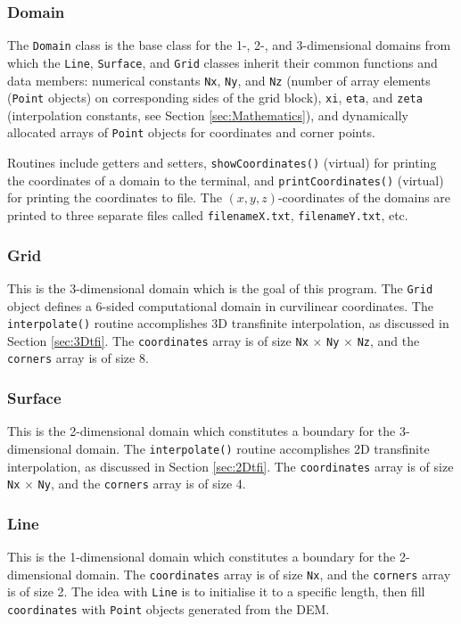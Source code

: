 \documentclass{article}
\renewcommand{\t}[1]{\texttt{#1}}
\begin{document}
\subsubsection{Domain}
The \t{Domain} class is the base class for the 1-, 2-, and 3-dimensional domains from which the \t{Line}, \t{Surface}, and \t{Grid} classes inherit their common functions and data members: numerical constants \t{Nx}, \t{Ny}, and \t{Nz} (number of array elements (\t{Point} objects) on corresponding sides of the grid block), \t{xi}, \t{eta}, and \t{zeta} (interpolation constants, see Section \ref{sec:Mathematics}), and dynamically allocated arrays of \t{Point} objects for coordinates and corner points. 

Routines include getters and setters, \t{showCoordinates()} (virtual) for printing the coordinates of a domain to the terminal, and \t{printCoordinates()} (virtual) for printing the coordinates to file. The $(x,y,z)$-coordinates of the domains are printed to three separate files called \t{filenameX.txt}, \t{filenameY.txt}, etc.

\subsubsection{Grid}
This is the 3-dimensional domain which is the goal of this program.  The \t{Grid} object defines a 6-sided computational domain in curvilinear coordinates. The \t{interpolate()} routine accomplishes 3D transfinite interpolation, as discussed in Section \ref{sec:3Dtfi}. The \t{coordinates} array is of size \t{Nx} $\times$ \t{Ny} $\times$ \t{Nz}, and the \t{corners} array is of size 8.

\subsubsection{Surface}
This is the 2-dimensional domain which constitutes a boundary for the 3-dimensional domain. The \t{interpolate()} routine accomplishes 2D transfinite interpolation, as discussed in Section \ref{sec:2Dtfi}. The \t{coordinates} array is of size \t{Nx} $\times$ \t{Ny}, and the \t{corners} array is of size 4.

\subsubsection{Line}
This is the 1-dimensional domain which constitutes a boundary for the 2-dimensional domain. The \t{coordinates} array is of size \t{Nx}, and the \t{corners} array is of size 2. The idea with \t{Line} is to initialise it to a specific length, then fill \t{coordinates} with \t{Point} objects generated from the DEM. 
\end{document}
